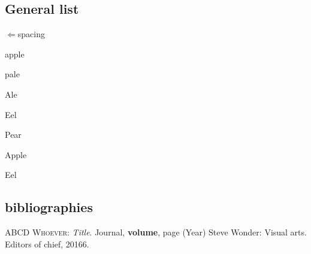 \subsection{General list}
\begin{list}{$\Leftarrow$}{spacing}
    \item apple
    \item pale
    \item Ale
    \item Eel
\end{list}

\begin{list}{}{}
    \item Pear
    \item Apple
    \item Eel
\end{list}

\newcommand{\bibart}[6]{\textsc{#1}: \textit{#2}. #3, \textbf{#4}, #5 (#6)}
\subsection{bibliographies}
\begin{thebibliography}{ABCD}
     \bibart{Whoever}{Title}{Journal}{volume}{page}{Year}
     Steve Wonder: Visual arts. Editors of chief, 20166.
\end{thebibliography}